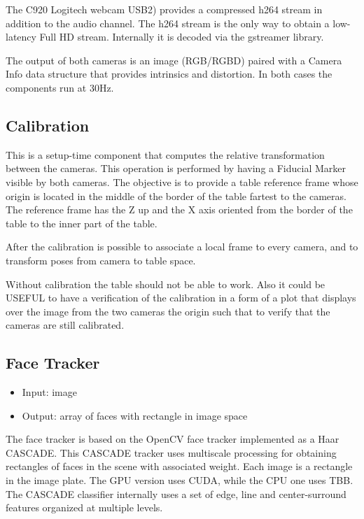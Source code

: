 \documentclass[a4paper,notitlepage,onecolumn]{hitec}  %
\begin{document}
The C920 Logitech webcam USB2) provides a compressed h264 stream in addition to the audio channel. The h264 stream is the only way to obtain a low-latency Full HD stream. Internally it is decoded via the gstreamer library. 

The output of both cameras is an image (RGB/RGBD) paired with a Camera Info data structure that provides intrinsics and distortion. In both cases the components run at 30Hz.


\subsection{Calibration}

This is a setup-time component that computes the relative transformation between the cameras. This operation is performed by having a Fiducial Marker visible by both cameras. The objective is to provide a table reference frame whose origin is located in the middle of the border of the table fartest to the cameras. The reference frame has the Z up and the X axis oriented from the border of the table to the inner part of the table.

After the calibration is possible to associate a local frame to every camera, and to transform poses from camera to table space.

Without calibration the table should not be able to work. Also it could be USEFUL to have a verification of the calibration in a form of a plot that displays over the image from the two cameras the origin such that to verify that the cameras are still calibrated. 

\subsection{Face Tracker}

\begin{itemize}
	\item Input: image
	\item Output: array of faces with rectangle in image space
\end{itemize}

The face tracker is based on the OpenCV face tracker implemented as a Haar CASCADE. This CASCADE tracker uses multiscale processing for obtaining rectangles of faces in the scene with associated weight. Each image is a rectangle in the image plate. The GPU version uses CUDA, while the CPU one uses TBB. The CASCADE classifier internally uses a set of edge, line and center-surround features organized at multiple levels.
\end{document}
